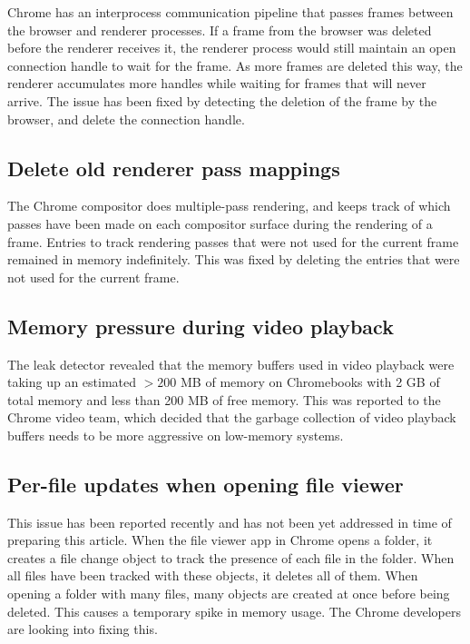 \documentclass[preprint, numbers]{sigplanconf}
\begin{document}
Chrome has an interprocess communication pipeline that passes frames between the browser and renderer processes. If a frame from the browser was deleted before the renderer receives it, the renderer process would still maintain an open connection handle to wait for the frame. As more frames are deleted this way, the renderer accumulates more handles while waiting for frames that will never arrive. The issue has been fixed by detecting the deletion of the frame by the browser, and delete the connection handle.

\subsection{Delete old renderer pass mappings \cite{cr-mappings}}

The Chrome compositor does multiple-pass rendering, and keeps track of which passes have been made on each compositor surface during the rendering of a frame. Entries to track rendering passes that were not used for the current frame remained in memory indefinitely. This was fixed by deleting the entries that were not used for the current frame.

\subsection{Memory pressure during video playback \cite{cr-playback}}

The leak detector revealed that the memory buffers used in video playback were taking up an estimated $>200$ MB of memory on Chromebooks with 2 GB of total memory and less than 200 MB of free memory. This was reported to the Chrome video team, which decided that the garbage collection of video playback buffers needs to be more aggressive on low-memory systems.

\subsection{Per-file updates when opening file viewer \cite{bug-files}}

This issue has been reported recently and has not been yet addressed in time of preparing this article.
When the file viewer app in Chrome opens a folder, it creates a file change object to track the presence of each file in the folder. When all files have been tracked with these objects, it deletes all of them. When opening a folder with many files, many objects are created at once before being deleted. This causes a temporary spike in memory usage. The Chrome developers are looking into fixing this.
\end{document}
